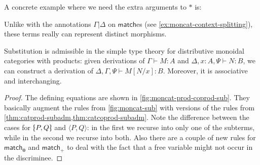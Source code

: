 \documentclass{book}
\let\types\vdash
\def\unit{\top}%
\def\ttt{\mathord{\ast}}%
\def\pair#1#2{\langle #1,#2\rangle}
\def\case{\mathsf{match}_+}
\def\match{\mathsf{match}}
\def\zero{\mathbf{0}}
\def\abort{\match_{\zero}}
\let\tensor\otimes
\def\tpair#1#2{\text{\textlquill} #1,#2 \text{\textrquill}}%
\begin{document}
A concrete example where we need the extra arguments to $\ttt$ is:
Unlike with the annotations $\Gamma|\Delta$ on $\match$es (see \cref{ex:moncat-context-splitting}), these terms really can represent distinct morphisms. %

\begin{thm}\label{thm:moncat-prod-coprod-subadm}
  Substitution is admissible in the {simple type theory for distributive monoidal categories with products}: given derivations of
  $\Gamma\types M:A$ and $\Delta,x:A,\Psi\types N:B$, we can construct a derivation of $\Delta,\Gamma,\Psi\types M[N/x]:B$.
  Moreover, it is associative and interchanging.
\end{thm}
\begin{proof}
  The defining equations are shown in \cref{fig:moncat-prod-coprod-sub}.
  They basically augment the rules from \cref{fig:moncat-sub} with versions of the rules from \cref{thm:catprod-subadm,thm:catcoprod-subadm}.
  Note the difference between the cases for $\tpair P Q$ and $\pair P Q$: in the first we recurse into only one of the subterms, while in the second we recurse into both.
  Also there are a couple of new rules for $\abort$ and $\case$ to deal with the fact that a free variable might not occur in the discriminee.
\end{proof}
\end{document}
